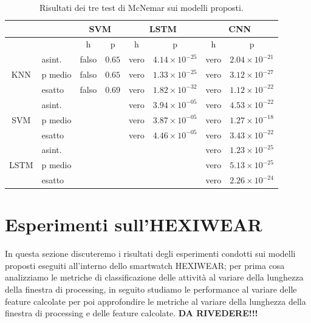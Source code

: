\begin{table}
    \centering
    \begin{tabular}{c | l | c c | c c | c c }
        \hline
        & & \multicolumn{2}{c}{SVM} & \multicolumn{2}{c}{LSTM} & \multicolumn{2}{c}{CNN} \\
        \hline
                                &            & h     & p    & h    & p                      & h    & p \\
        \hline
        \multirow{3}{*}{KNN}    & asint.     & falso & $0.65$ & vero & $4.14 \times 10^{-25}$ & vero & $2.04 \times 10^{-21}$ \\
                                & p medio    & falso & $0.65$ & vero & $1.33 \times 10^{-25}$ & vero & $3.12 \times 10^{-27}$ \\
                                & esatto     & falso & $0.69$ & vero & $1.82 \times 10^{-32}$ & vero & $1.12 \times 10^{-22}$ \\
        \hline
        \multirow{3}{*}{SVM}    & asint.     &       &        & vero & $3.94 \times 10^{-05}$ & vero & $4.53 \times 10^{-22}$ \\
                                & p medio    &       &        & vero & $3.87 \times 10^{-05}$ & vero & $1.27 \times 10^{-18}$ \\
                                & esatto     &       &        & vero & $4.46 \times 10^{-05}$ & vero & $3.43 \times 10^{-22}$ \\
        \hline
        \multirow{3}{*}{LSTM}   & asint.     &       &        &      &                        & vero & $1.23 \times 10^{-25}$ \\
                                & p medio    &       &        &      &                        & vero & $5.13 \times 10^{-25}$ \\
                                & esatto     &       &        &      &                        & vero & $2.26 \times 10^{-24}$ \\ 
        \hline
    \end{tabular}
    \caption{Risultati dei tre test di McNemar sui modelli proposti.}
    \label{tab:mc-nemar-results}
\end{table}

\section{Esperimenti sull'HEXIWEAR}
\label{sec:esperimenti-sull-hexiwear}

In questa sezione discuteremo i risultati degli esperimenti condotti sui modelli proposti eseguiti all'interno dello smartwatch HEXIWEAR; per prima cosa analizziamo le metriche di classificazione delle attività al variare della lunghezza della finestra di processing, in seguito studiamo le performance al variare delle feature calcolate per poi approfondire le metriche al variare della lunghezza della finestra di processing e delle feature calcolate. \textbf{DA RIVEDERE!!!}

